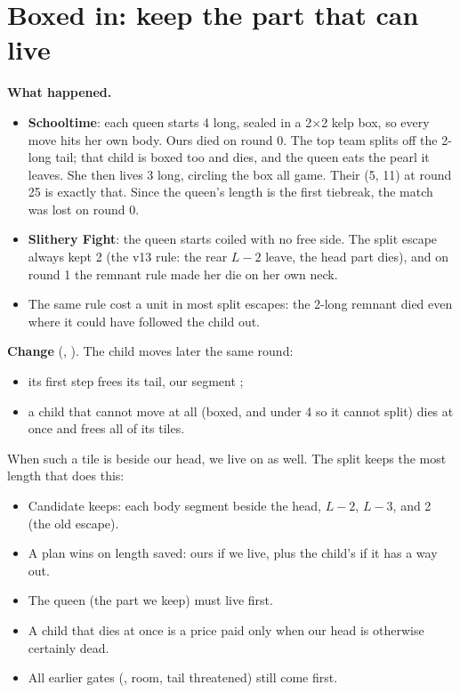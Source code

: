 \documentclass[11pt,a4paper]{article}
\newcommand{\code}[1]{\texttt{\detokenize{#1}}}
\begin{document}
\section{Boxed in: keep the part that can live}\label{sec:keep}
\textbf{What happened.}
\begin{itemize}
  \item \textbf{Schooltime}: each queen starts 4 long, sealed in a 2$\times$2 kelp box, so every move hits her own body. Ours died
        on round 0. The top team splits off the 2-long tail; that child is boxed too and dies, and the queen eats the pearl it
        leaves. She then lives 3 long, circling the box all game. Their (5, 11) at round 25 is exactly that. Since the queen's
        length is the first tiebreak, the match was lost on round 0.
  \item \textbf{Slithery Fight}: the queen starts coiled with no free side. The split escape always kept 2 (the v13 rule: the rear
        $L-2$ leave, the head part dies), and on round 1 the remnant rule made her die on her own neck.
  \item The same rule cost a unit in most split escapes: the 2-long remnant died even where it could have followed the child out.
\end{itemize}
\textbf{Change} (\code{endgame.hpp}, \code{choose_escape}). The child moves later the same round:
\begin{itemize}
  \item its first step frees its tail, our segment \code{keep};
  \item a child that cannot move at all (boxed, and under 4 so it cannot split) dies at once and frees all of its tiles.
\end{itemize}
When such a tile is beside our head, we live on as well. The split keeps the most length that does this:
\begin{itemize}
  \item Candidate keeps: each body segment beside the head, $L-2$, $L-3$, and 2 (the old escape).
  \item A plan wins on length saved: ours if we live, plus the child's if it has a way out.
  \item The queen (the part we keep) must live first.
  \item A child that dies at once is a price paid only when our head is otherwise certainly dead.
  \item All earlier gates (\code{fine}, room, tail threatened) still come first.
\end{itemize}
\end{document}

